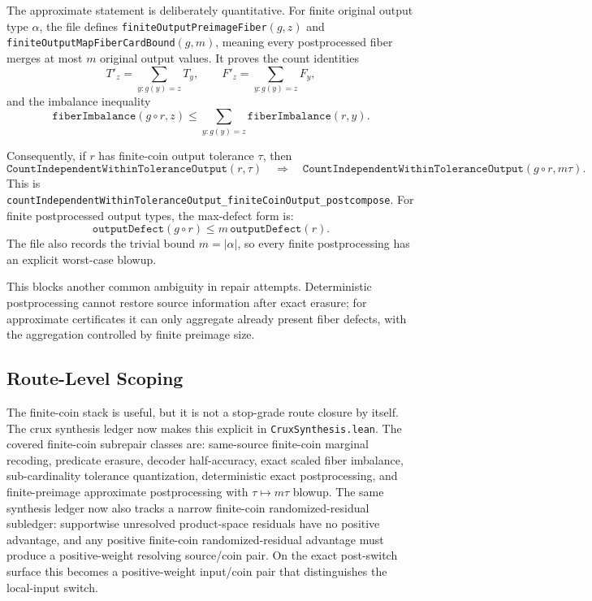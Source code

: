 \documentclass[11pt]{article}
\theoremstyle{remark}
\begin{document}
The approximate statement is deliberately quantitative.  For finite original
output type \(\alpha\), the file defines
\texttt{finiteOutputPreimageFiber}\((g,z)\) and
\texttt{finiteOutputMapFiberCardBound}\((g,m)\), meaning every postprocessed
fiber merges at most \(m\) original output values.  It proves the count
identities
\[
  T'_z=\sum_{y:g(y)=z} T_y,\qquad
  F'_z=\sum_{y:g(y)=z} F_y,
\]
and the imbalance inequality
\[
  \texttt{fiberImbalance}(g\circ r,z)
  \le
  \sum_{y:g(y)=z}\texttt{fiberImbalance}(r,y).
\]

Consequently, if \(r\) has finite-coin output tolerance \(\tau\), then
\[
  \texttt{CountIndependentWithinToleranceOutput}(r,\tau)
  \quad\Longrightarrow\quad
  \texttt{CountIndependentWithinToleranceOutput}(g\circ r,m\tau).
\]
This is
\texttt{countIndependentWithinToleranceOutput\_finiteCoinOutput\_postcompose}.
For finite postprocessed output types, the max-defect form is:
\[
  \texttt{outputDefect}(g\circ r)
  \le
  m\,\texttt{outputDefect}(r).
\]
The file also records the trivial bound \(m=|\alpha|\), so every finite
postprocessing has an explicit worst-case blowup.

This blocks another common ambiguity in repair attempts.  Deterministic
postprocessing cannot restore source information after exact erasure; for
approximate certificates it can only aggregate already present fiber defects,
with the aggregation controlled by finite preimage size.

\subsection{Route-Level Scoping}

The finite-coin stack is useful, but it is not a stop-grade route closure by
itself.  The crux synthesis ledger now makes this explicit in
\texttt{CruxSynthesis.lean}.  The covered finite-coin subrepair classes are:
same-source finite-coin marginal recoding, predicate erasure, decoder
half-accuracy, exact scaled fiber imbalance, sub-cardinality tolerance
quantization, deterministic exact postprocessing, and finite-preimage
approximate postprocessing with \(\tau\mapsto m\tau\) blowup.
The same synthesis ledger now also tracks a narrow finite-coin
randomized-residual subledger: supportwise unresolved product-space residuals
have no positive advantage, and any positive finite-coin randomized-residual
advantage must produce a positive-weight resolving source/coin pair.  On the
exact post-switch surface this becomes a positive-weight input/coin pair that
distinguishes the local-input switch.
\end{document}
